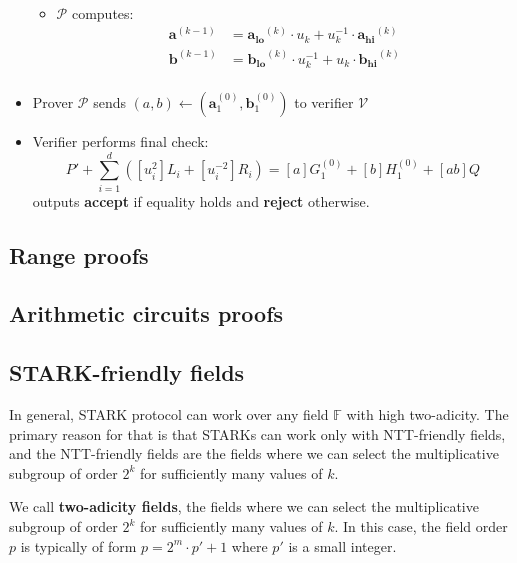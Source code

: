 \documentclass[../lecture-notes-148x210.tex]{subfiles}
\begin{document}
\begin{definition}
\begin{itemize}
\begin{itemize}
\begin{align*}
                    \end{align*}
                \item $\mathcal{P}$ computes:
                    \begin{align*}
                        \mathbf{a}^{(k-1)} &= \mathbf{a_{lo}}^{(k)} \cdot u_k + u_k^{-1} \cdot \mathbf{a_{hi}}^{(k)} \\
                        \mathbf{b}^{(k-1)} &= \mathbf{b_{lo}}^{(k)} \cdot u_k^{-1} + u_k \cdot \mathbf{b_{hi}}^{(k)} \\
                    \end{align*}
            \end{itemize}
        \item Prover $\mathcal{P}$ sends $(a,b) \gets (\mathbf{a}_1^{(0)}, \mathbf{b}_1^{(0)})$ to verifier $\mathcal{V}$
        \item Verifier performs final check: 
            $$P' + \sum_{i=1}^d ([u_i^2]L_i + [u_i^{-2}]R_i) = [a]G_1^{(0)} + [b]H_1^{(0)} + [ab]Q$$
        outputs \textbf{accept} if equality holds and \textbf{reject} otherwise.
    \end{itemize}
\end{definition}

\subsection{Range proofs}

\subsection{Arithmetic circuits proofs}

\subsection{STARK-friendly fields}
In general, STARK protocol can work over any field $\mathbb{F}$ with high two-adicity. The primary 
reason for that is that STARKs can work only with NTT-friendly fields, and the
NTT-friendly fields are the fields where we can select the multiplicative
subgroup of order $2^k$ for sufficiently many values of $k$. 

\begin{definition}
    We call \textbf{two-adicity fields}, the fields where we can select the
    multiplicative subgroup of order $2^k$ for sufficiently many values of $k$.
    In this case, the field order $p$ is typically of form $p = 2^m \cdot p' +
    1$ where $p'$ is a small integer.
\end{definition}
\end{document}
